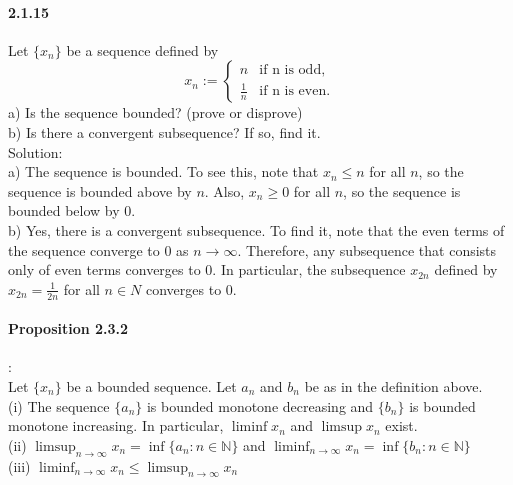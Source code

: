 \documentclass{article}
\begin{document}
\paragraph{2.1.15}
Let $\{x_n\}$ be a sequence defined by $$x_n:=\begin{cases}
    n & \text{if n is odd,}\\
    \frac{1}{n} & \text{if n is even.}
\end{cases}$$
a) Is the sequence bounded? (prove or disprove)\\
b) Is there a convergent subsequence? If so, find it.\\
Solution:\\
a) The sequence is bounded. To see this, note that $x_n\leq n$ for all $n$, so the sequence is bounded above by $n$. Also, $x_n\geq 0$ for all $n$, so the sequence is bounded below by 0.\\
b) Yes, there is a convergent subsequence. To find it, note that the even terms of the sequence converge to 0 as $n\to \infty$. Therefore, any subsequence that consists only of even terms converges to 0. In particular, the subsequence ${x_{2n}}$ defined by $x_{2n}=\frac{1}{2n}$ for all $n\in N$ converges to 0.
\paragraph{Proposition 2.3.2}:\\
Let $\{x_n\}$ be a bounded sequence. Let $a_n$ and $b_n$ be as in the definition above.\\
(i) The sequence $\{a_n\}$ is bounded monotone decreasing and $\{b_n\}$ is bounded monotone increasing. In particular, $\liminf x_n$ and $\limsup x_n$ exist.\\
(ii) $\limsup_{n\to \infty}x_n=\inf \{a_n:n\in \mathbb{N}\}$ and $\liminf_{n\to \infty}x_n=\inf \{b_n:n\in \mathbb{N}\}$\\
(iii) $\liminf_{n\to \infty}x_n\leq \limsup_{n\to \infty}x_n$
\end{document}
